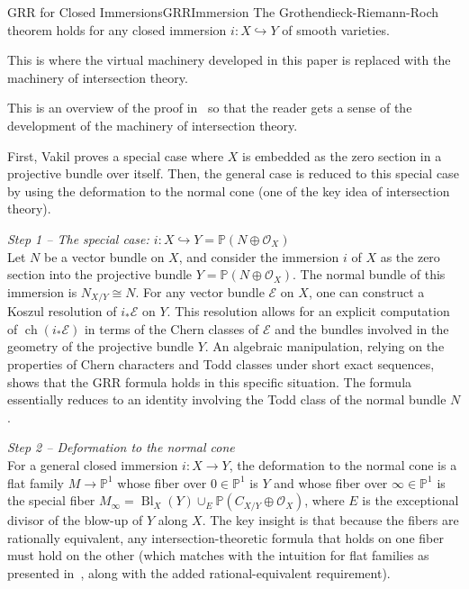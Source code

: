 \documentclass{book}
\newenvironment{Proof}[1][]
  {\begin{ProofTcb}[#1]}
  {\end{ProofTcb}}
\renewcommand{\P}{{\mathbb{P}}}
\newcommand{\CO}{{\mathcal{O}}}
\newcommand{\ch}{{\operatorname{ch}}}
\renewcommand{\ch}{{\operatorname{ch}}}
\begin{document}
\begin{prop}{GRR for Closed Immersions}{GRRImmersion}
    The Grothendieck-Riemann-Roch theorem holds for any closed immersion $i: X \hookrightarrow Y$ of smooth varieties.
\end{prop}

This is where the virtual machinery developed in this paper is replaced with the machinery of intersection
theory.

\begin{Proof}
    This is an overview of the proof in~\cite{vakilIntersectionTheory} so that the reader gets a sense of the
    development of the machinery of intersection theory.

   First, Vakil proves a special case where $X$ is embedded as the zero section in a projective
   bundle over itself. Then, the general case is reduced to this special case by using the deformation to the
   normal cone (one of the key idea of intersection theory).

  \emph{Step 1 -- The special case: $i: X \hookrightarrow Y = \P(N \oplus \CO_X)$}\\
  Let $N$ be a vector bundle on $X$, and consider the immersion $i$ of $X$ as the zero section into the
  projective bundle $Y = \P(N \oplus \CO_X)$. The normal bundle of this immersion is $N_{X/Y} \cong N$. For any
  vector bundle $\mathcal{E}$ on $X$, one can construct a Koszul resolution of $i_*\mathcal{E}$ on $Y$. This
  resolution allows for an explicit computation of $\ch(i_*\mathcal{E})$ in terms of the Chern classes of
  $\mathcal{E}$ and the bundles involved in the geometry of the projective bundle $Y$. An algebraic
  manipulation, relying on the properties of Chern characters and Todd classes under short exact sequences,
  shows that the GRR formula holds in this specific situation. The formula essentially reduces to an identity
  involving the Todd class of the normal bundle $N$.

  \emph{Step 2 -- Deformation to the normal cone}\\
  For a general closed immersion $i: X \to Y$, the deformation to the normal cone is a flat family $M \to \P^1$
  whose fiber over $0 \in \P^1$ is $Y$ and whose fiber over $\infty \in \P^1$ is the special fiber $M_\infty =
  \operatorname{Bl}_X(Y) \cup_E \P(C_{X/Y} \oplus \CO_X)$, where $E$ is the exceptional divisor of the blow-up
  of $Y$ along $X$. The key insight is that because the fibers are rationally equivalent, any
  intersection-theoretic formula that holds on one fiber must hold on the other (which matches with the
  intuition for flat families as presented in~\cite{hartshorneAlgebraicGeometry2013}, along with the added
  rational-equivalent requirement).


\end{Proof}
\end{document}
